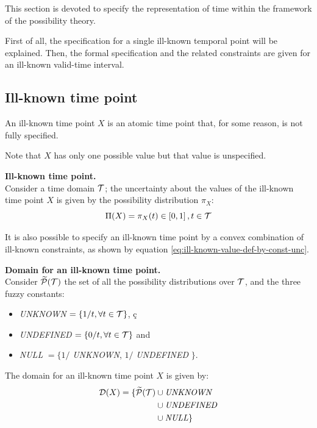 %
%

This section is devoted to specify the representation of time within the framework of the possibility theory. 

First of all, the specification for a single ill-known temporal point will be explained. Then, the formal specification and the related constraints are given for an ill-known valid-time interval.

\subsection{\label{subsec:ill-known-point-rep}Ill-known time point}
An ill-known time point $X$ is an atomic time point that, for some reason, is not fully specified. 

Note that $X$ has only one possible value but that value is unspecified.

\begin{definition}
\label{def:ill-known-time-point}
\textbf{Ill-known time point.}\\
Consider a time domain $\mathcal{T}$; the uncertainty about the values of the ill-known time point $X$ is given by the possibility distribution $\pi_X$:
\begin{equation}
\label{eq:ill-known-time-point}
\Pi(X) = \pi_X(t) \in \left[0,1\right] , t \in \mathcal{T}
\end{equation}
\end{definition}

It is also possible to specify an ill-known time point by a convex combination of ill-known constraints, as shown by equation \eqref{eq:ill-known-value-def-by-const-unc}.



\begin{definition}
\label{def:ill-known-domain}
\textbf{Domain for an ill-known time point.}\\
Consider $\widetilde{\mathcal{P}}(\mathcal{T})$ the set of all the possibility distributions over $\mathcal{T}$, and the three fuzzy constants:

\begin{itemize}

\item \emph{UNKNOWN} $=\left\lbrace 1/t, \forall t \in \mathcal{T} \right\rbrace$, ç
\item \emph{UNDEFINED} $=\left\lbrace 0/t,\forall t \in \mathcal{T} \right\rbrace$ and \item \emph{NULL} $=\lbrace 1/$ \emph{UNKNOWN}, $1/$ \emph{UNDEFINED} $\rbrace$. 
\end{itemize}

The domain for an ill-known time point $X$ is given by: 
\begin{align}
\label{eq:ill-known-domain}
\Dom (X) =  \lbrace \tilde\Pow(\T) & \cup \mbox{\emph{UNKNOWN}} \\
\nonumber
&\cup \mbox{\emph{UNDEFINED}} \\
\nonumber
&\cup \mbox{\emph{NULL}} \rbrace
%
\end{align}
\end{definition}




